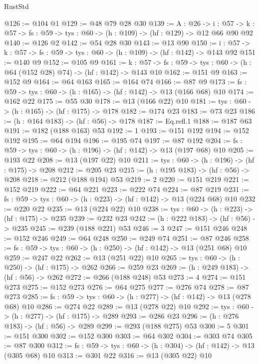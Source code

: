 \begin{lexlean}{RustStd}
\begin{coremodule}
{\begin{coremodule}
{@126 := @104 @1
@129 := @48 @79 @28 @30
@139 := {A : @26} ->
  {i : @57} ->
  {k : @57} -> {fs : @59} -> {tys : @60} -> (h : @109) -> (hf : @129) -> @12 @66 @90 @92
@140 := @126 @2
@142 := @54 @28 @30
@143 := @13 @90
@150 := {i : @57} -> {k : @57} -> {fs : @59} -> {tys : @60} -> (h : @109) -> (hf : @142) -> @143 @92
@151 := @140 @9
@152 := @105 @9
@161 := {k : @57} ->
  {fs : @59} -> {tys : @60} -> (h : @64 (@152 @28) @74) -> (hf : @142) -> @143 @10
@162 := @151 @9
@163 := @152 @9
@164 := @64 @163
@165 := @164 @74
@166 := @87 @9
@173 := {fs : @59} -> {tys : @60} -> (h : @165) -> (hf : @142) -> @13 (@166 @68) @10
@174 := @162 @22
@175 := @55 @30
@178 := @13 (@166 @22) @10
@181 := {tys : @60} -> (h : @165) -> (hf : @175) -> @178
@182 := @174 @23
@183 := @73 @23
@186 := (h : @164 @183) -> (hf : @56) -> @178
@187 := Eq.refl.{1}
@188 := @187 @63
@191 := @182 (@188 @163) @53
@192 := 1
@193 := @151 @192
@194 := @152 @192
@195 := @64 @194
@196 := @195 @74
@197 := @87 @192
@204 := {fs : @59} -> {tys : @60} -> (h : @196) -> (hf : @142) -> @13 (@197 @68) @10
@205 := @193 @22
@208 := @13 (@197 @22) @10
@211 := {tys : @60} -> (h : @196) -> (hf : @175) -> @208
@212 := @205 @23
@215 := (h : @195 @183) -> (hf : @56) -> @208
@218 := @212 (@188 @194) @53
@219 := 2
@220 := @151 @219
@221 := @152 @219
@222 := @64 @221
@223 := @222 @74
@224 := @87 @219
@231 := {fs : @59} -> {tys : @60} -> (h : @223) -> (hf : @142) -> @13 (@224 @68) @10
@232 := @220 @22
@235 := @13 (@224 @22) @10
@238 := {tys : @60} -> (h : @223) -> (hf : @175) -> @235
@239 := @232 @23
@242 := (h : @222 @183) -> (hf : @56) -> @235
@245 := @239 (@188 @221) @53
@246 := 3
@247 := @151 @246
@248 := @152 @246
@249 := @64 @248
@250 := @249 @74
@251 := @87 @246
@258 := {fs : @59} -> {tys : @60} -> (h : @250) -> (hf : @142) -> @13 (@251 @68) @10
@259 := @247 @22
@262 := @13 (@251 @22) @10
@265 := {tys : @60} -> (h : @250) -> (hf : @175) -> @262
@266 := @259 @23
@269 := (h : @249 @183) -> (hf : @56) -> @262
@272 := @266 (@188 @248) @53
@273 := 4
@274 := @151 @273
@275 := @152 @273
@276 := @64 @275
@277 := @276 @74
@278 := @87 @273
@285 := {fs : @59} -> {tys : @60} -> (h : @277) -> (hf : @142) -> @13 (@278 @68) @10
@286 := @274 @22
@289 := @13 (@278 @22) @10
@292 := {tys : @60} -> (h : @277) -> (hf : @175) -> @289
@293 := @286 @23
@296 := (h : @276 @183) -> (hf : @56) -> @289
@299 := @293 (@188 @275) @53
@300 := 5
@301 := @151 @300
@302 := @152 @300
@303 := @64 @302
@304 := @303 @74
@305 := @87 @300
@312 := {fs : @59} -> {tys : @60} -> (h : @304) -> (hf : @142) -> @13 (@305 @68) @10
@313 := @301 @22
@316 := @13 (@305 @22) @10
}
\end{coremodule}}
\end{coremodule}
\end{lexlean}

